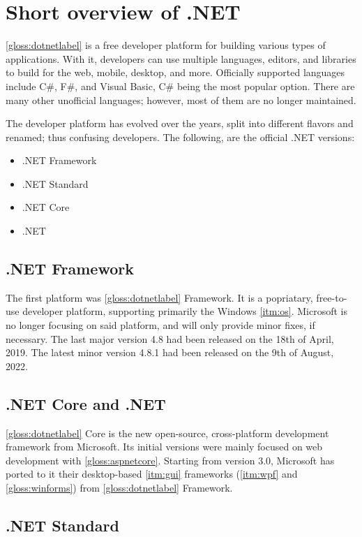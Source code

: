 \chapter{Short overview of .NET}
\ref{gloss:dotnetlabel} is a free developer platform for building various types of applications. With it, developers can use multiple languages, editors, and libraries to build for the web, mobile, desktop, and more.
Officially supported languages include C\#, F\#, and Visual Basic, C\# being the most popular option. There are many other unofficial languages; however, most of them are no longer maintained.

The developer platform has evolved over the years, split into different flavors and renamed; thus confusing developers.
The following, are the official .NET versions:
\begin{itemize}
    \item .NET Framework
    \item .NET Standard
    \item .NET Core
    \item .NET
\end{itemize}

\section{.NET Framework}

The first platform was \ref{gloss:dotnetlabel} Framework. It is a popriatary, free-to-use developer platform, supporting primarily the Windows \ref{itm:os}. Microsoft is no longer focusing on said platform, and will only provide minor fixes, if necessary. The last major version 4.8 had been released on the 18th of April, 2019. The latest minor version 4.8.1 had been released on the 9th of August, 2022.

\section{.NET Core and .NET}

\ref{gloss:dotnetlabel} Core is the new open-source, cross-platform development framework from Microsoft. Its initial versions were mainly focused on web development with \ref{gloss:aspnetcore}. Starting from version 3.0, Microsoft has ported to it their desktop-based \ref{itm:gui} frameworks (\ref{itm:wpf} and \ref{gloss:winforms}) from \ref{gloss:dotnetlabel} Framework.

\section{.NET Standard}

